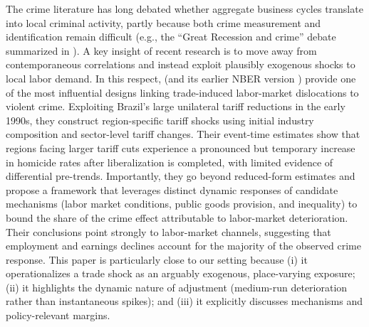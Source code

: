 The crime literature has long debated whether aggregate business cycles translate into local criminal activity, partly because both crime measurement and identification remain difficult (e.g., the ``Great Recession and crime'' debate summarized in \citealp{dixcarneirosoaresulyssea2018economic}). A key insight of recent research is to move away from contemporaneous correlations and instead exploit plausibly exogenous shocks to local labor demand. In this respect, \citet{dixcarneirosoaresulyssea2018economic} (and its earlier NBER version \citealp{dixcarneirosoaresulyssea2017economic}) provide one of the most influential designs linking trade-induced labor-market dislocations to violent crime. Exploiting Brazil's large unilateral tariff reductions in the early 1990s, they construct region-specific tariff shocks using initial industry composition and sector-level tariff changes. Their event-time estimates show that regions facing larger tariff cuts experience a pronounced but temporary increase in homicide rates after liberalization is completed, with limited evidence of differential pre-trends. Importantly, they go beyond reduced-form estimates and propose a framework that leverages distinct dynamic responses of candidate mechanisms (labor market conditions, public goods provision, and inequality) to bound the share of the crime effect attributable to labor-market deterioration. Their conclusions point strongly to labor-market channels, suggesting that employment and earnings declines account for the majority of the observed crime response. This paper is particularly close to our setting because (i) it operationalizes a trade shock as an arguably exogenous, place-varying exposure; (ii) it highlights the dynamic nature of adjustment (medium-run deterioration rather than instantaneous spikes); and (iii) it explicitly discusses mechanisms and policy-relevant margins.

